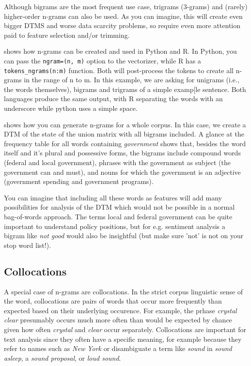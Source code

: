 Although bigrams are the most frequent use case, trigrams (3-grams) and (rarely) higher-order n-grams can also be used.
As you can imagine, this will create even bigger DTMS and worse data scarcity problems,
so require even more attention paid to feature selection and/or trimming.



 shows how n-grams can be created and used in Python and R.
In Python, you can pass the \verb|ngram=(n, m)| option to the vectorizer,
while R has a \verb|tokens_ngrams(n:m)| function.
Both will post-process the tokens to create all n-grams in the range of n to m.
In this example, we are asking for unigrams (i.e., the words themselves), bigrams and trigrams of a simple examp[le sentence.
Both languages produce the same output, with R separating the words with an underscore while python uses a simple space.


 shows how you can generate n-grams for a whole corpus.
In this case, we create a DTM of the state of the union matrix with all bigrams included.
A glance at the frequency table for all words containing \emph{government} shows that,
besides the word itself and it's plural and possessive forms, the bigrams include compound words (federal and local government),
phrases with  the government as subject (the government can and must), and nouns for which the government is an adjective
(government spending and government programs).

You can imagine that including all these words as features will add many possibilities for analysis of the DTM
which would not be possible in a normal bag-of-words approach.
The terms local and federal government can be quite important to understand policy positions,
but for e.g. sentiment analysis a bigram like \emph{not good} would also be insightful
(but make sure 'not' is not on your stop word list!).   

\subsection{Collocations}

A special case of n-grams are collocations.
In the strict corpus linguistic sense of the word, collocations are pairs of words that occur more frequently than expected
based on their underlying occurence.
For example, the prhase \emph{crystal clear} presumably occurs much more often than would be expected by chance given
how often \emph{crystal} and \emph{clear} occur separately.
Collocations are important for text analysis since they often have a specific meaning,
for example because they refer to names such as \emph{New York} or disambiguate a term like \emph{sound} in \emph{sound asleep},
a \emph{sound proposal}, or \emph{loud sound}.

